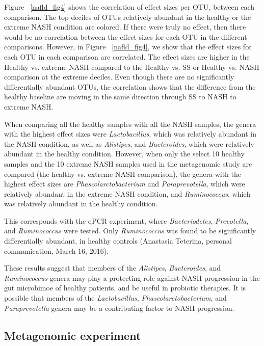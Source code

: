 \FloatBarrier

Figure ~\ref{nafld_fig4} shows the correlation of effect sizes per OTU, between each comparison. The top deciles of OTUs relatively abundant in the healthy or the extreme NASH condition are colored. If there were truly no effect, then there would be no correlation between the effect sizes for each OTU in the different comparisons. However, in Figure ~\ref{nafld_fig4}, we show that the effect sizes for each OTU in each comparison are correlated. The effect sizes are higher in the Healthy vs. extreme NASH compared to the Healthy vs. SS or Healthy vs. NASH comparison at the extreme deciles. Even though there are no significantly differentially abundant OTUs, the correlation shows that the difference from the healthy baseline are moving in the same direction through SS to NASH to extreme NASH.

When comparing all the healthy samples with all the NASH samples, the genera with the highest effect sizes were \textit{Lactobacillus}, which was relatively abundant in the NASH condition, as well as \textit{Alistipes}, and \textit{Bacteroides}, which were relatively abundant in the healthy condition. However, when only the select 10 healthy samples and the 10 extreme NASH samples used in the metagenomic study are compared (the healthy vs. extreme NASH comparison), the genera with the highest effect sizes are \textit{Phascolarctobacterium} and \textit{Paraprevotella}, which were relatively abundant in the extreme NASH condition, and \textit{Ruminococcus}, which was relatively abundant in the healthy condition.

This corresponds with the qPCR experiment, where \textit{Bacteriodetes}, \textit{Prevotella}, and \textit{Ruminococcus} were tested. Only \textit{Ruminococcus} was found to be significantly differentially abundant, in healthy controls (Anastasia Teterina, personal communication, March 16, 2016).

These results suggest that members of the \textit{Alistipes}, \textit{Bacteroides}, and \textit{Ruminococcus} genera may play a protecting role against NASH progression in the gut microbimoe of healthy patients, and be useful in probiotic therapies. It is possible that members of the \textit{Lactobacillus}, \textit{Phascolarctobacterium}, and \textit{Paraprevotella} genera may be a contributing factor to NASH progression.

\FloatBarrier

\subsection{Metagenomic experiment}

